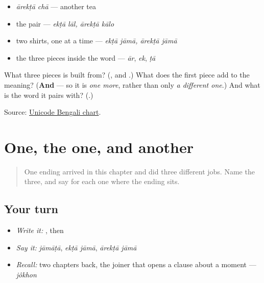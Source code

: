 \begin{itemize}
\raggedright
  \item \emph{ārekṭā chā} — another tea
  \item the pair — \emph{ekṭā lāl, ārekṭā kālo}
  \item two shirts, one at a time — \emph{ekṭā jāmā, ārekṭā jāmā}
  \item the three pieces inside the word — \emph{ār}, \emph{ek}, \emph{ṭā}
\end{itemize}

\begin{tcolorbox}[breakable,colback=teal!4,colframe=teal!35!black,title={Before you move on}]
What three pieces is \textbf{} built from? (\textbf{}, \textbf{} and \textbf{}.) What does the first piece add to the meaning? (\textbf{And} — so it is \emph{one more}, rather than only \emph{a different one}.) And what is the word it pairs with? (\textbf{}.)

Source: \href{https://www.unicode.org/charts/PDF/U0980.pdf}{Unicode Bengali chart}.
\end{tcolorbox}
\section[\texorpdfstring{\bn{টা} · \bn{একটা} · \bn{আরেকটা} (-ṭā · ekṭā · ārekṭā)}{টা · একটা · আরেকটা (-ṭā · ekṭā · ārekṭā)}]{One, the one, and another}

\label{lesson:BN-R20-one-and-another}



\begin{quote}
One ending arrived in this chapter and did three different jobs. Name the three, and say for each one where the ending sits.
\end{quote}

\subsection*{Your turn}
\begin{itemize}
\raggedright
  \item \emph{Write it:} , then 
  \item \emph{Say it:} \emph{jāmāṭā}, \emph{ekṭā jāmā}, \emph{ārekṭā jāmā}
  \item \emph{Recall:} two chapters back, the joiner that opens a clause about a moment — \emph{jôkhon}
\end{itemize}

